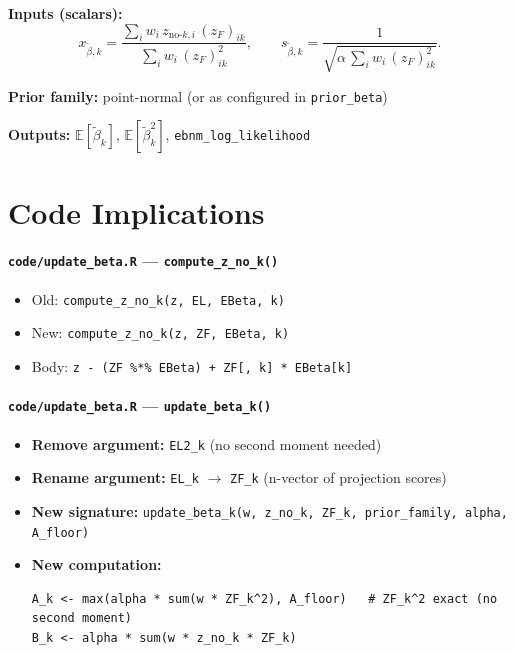 \documentclass[11pt]{article}
\newcommand{\E}{\mathbb{E}}
\begin{document}
\begin{ebnmbox}
\textbf{Inputs (scalars):}
\[
  x_{\tilde\beta,k} = \frac{\sum_i w_i\,z_{\text{no-}k,i}\,(z_F)_{ik}}{\sum_i w_i\,(z_F)_{ik}^2},
  \qquad
  s_{\tilde\beta,k} = \frac{1}{\sqrt{\alpha\,\sum_i w_i\,(z_F)_{ik}^2}}.
\]

\textbf{Prior family:} point-normal (or as configured in \texttt{prior\_beta})

\vspace{6pt}
\textbf{Outputs:} $\E[\tilde\beta_k]$, $\E[\tilde\beta_k^2]$, \texttt{ebnm\_log\_likelihood}
\end{ebnmbox}

\section{Code Implications}

\paragraph{\texttt{code/update\_beta.R} — \texttt{compute\_z\_no\_k()}}
\begin{itemize}
  \item Old: \texttt{compute\_z\_no\_k(z, EL, EBeta, k)}
  \item New: \texttt{compute\_z\_no\_k(z, ZF, EBeta, k)}
  \item Body: \texttt{z - (ZF \%*\% EBeta) + ZF[, k] * EBeta[k]}
\end{itemize}

\paragraph{\texttt{code/update\_beta.R} — \texttt{update\_beta\_k()}}
\begin{itemize}
  \item \textbf{Remove argument:} \texttt{EL2\_k} (no second moment needed)
  \item \textbf{Rename argument:} \texttt{EL\_k} $\to$ \texttt{ZF\_k} (n-vector of projection scores)
  \item \textbf{New signature:} \texttt{update\_beta\_k(w, z\_no\_k, ZF\_k, prior\_family, alpha, A\_floor)}
  \item \textbf{New computation:}
    \begin{verbatim}
A_k <- max(alpha * sum(w * ZF_k^2), A_floor)   # ZF_k^2 exact (no second moment)
B_k <- alpha * sum(w * z_no_k * ZF_k)
    \end{verbatim}
\end{itemize}
\end{document}
